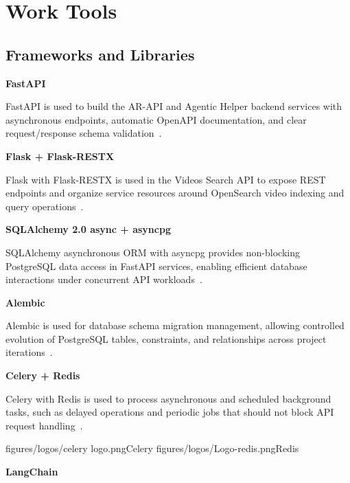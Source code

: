 \section{Work Tools}

\subsection{Frameworks and Libraries}

\textbf{FastAPI}

FastAPI is used to build the AR-API and Agentic Helper backend services with asynchronous endpoints,
automatic OpenAPI documentation, and clear request/response schema validation~.


\textbf{Flask + Flask-RESTX}

Flask with Flask-RESTX is used in the Videos Search API to expose REST endpoints and organize service
resources around OpenSearch video indexing and query operations~.


\textbf{SQLAlchemy 2.0 async + asyncpg}

SQLAlchemy asynchronous ORM with asyncpg provides non-blocking PostgreSQL data access in FastAPI
services, enabling efficient database interactions under concurrent API workloads~.


\textbf{Alembic}

Alembic is used for database schema migration management, allowing controlled evolution of PostgreSQL
tables, constraints, and relationships across project iterations~.


\textbf{Celery + Redis}

Celery with Redis is used to process asynchronous and scheduled background tasks, such as delayed
operations and periodic jobs that should not block API request handling~.

\toollogodouble
  {figures/logos/celery logo.png}{Celery}
  {figures/logos/Logo-redis.png}{Redis}

\textbf{LangChain}

